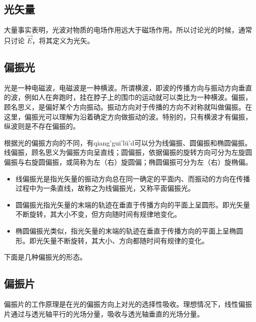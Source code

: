 
\begin{issues}
\issueDraft
\end{issues}


\subsection{光矢量}
大量事实表明，光波对物质的电场作用远大于磁场作用。所以讨论光的时候，通常只讨论 $\vec{E}$，将其定义为光矢。

\subsection{偏振光}

光是一种电磁波，电磁波是一种横波。所谓横波，即波的传播方向与振动方向垂直的波，例如人在奔跑时，挂在脖子上的围巾的运动就可以类比为一种横波。偏振，顾名思义，是偏好某个方向振动。振动方向对于传播的方向不对称就叫做偏振。在这里，偏振光可以理解为沿着确定方向做振动的波。特别的，只有横波才有偏振，纵波则是不存在偏振的。

根据光的偏振方向的不同，有qiang'gui'lü'd可以分为线偏振、圆偏振和椭圆偏振。线偏振，顾名思义为偏振方向呈直线；圆偏振，依据偏振的旋转方向可分为左旋圆偏振与右旋圆偏振，或简称为左（右）旋圆偏；椭圆偏振可分为左（右）旋椭偏。

\begin{itemize}
\item 线偏振光是指光矢量的振动方向总在同一确定的平面内、而振动的方向在传播过程中为一条直线，故称之为线偏振光，又称平面偏振光。
\item 圆偏振光指光矢量的末端的轨迹在垂直于传播方向的平面上呈圆形。即光矢量不断旋转，其大小不变，但方向随时间有规律地变化。
\item 椭圆偏振光类似，指光矢量的末端的轨迹在垂直于传播方向的平面上呈椭圆形。即光矢量不断旋转，其大小、方向都随时间有规律的变化。
\end{itemize}


下面是几种偏振光的形态。


\subsection{偏振片}
偏振片的工作原理是在光的偏振方向上对光的选择性吸收。理想情况下，线性偏振片通过与透光轴平行的光场分量，吸收与透光轴垂直的光场分量。

